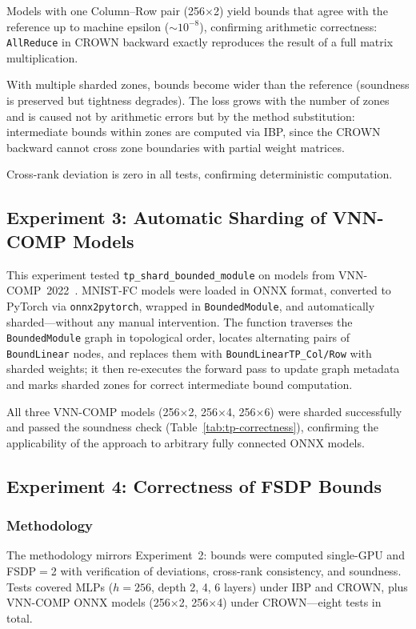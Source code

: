 Models with one Column--Row pair (256$\times$2) yield bounds that agree with
the reference up to machine epsilon ($\sim\!10^{-8}$), confirming arithmetic
correctness: \texttt{AllReduce} in CROWN backward exactly reproduces the result
of a full matrix multiplication.

With multiple sharded zones, bounds become wider than the reference (soundness
is preserved but tightness degrades). The loss grows with the number of zones
and is caused not by arithmetic errors but by the method substitution:
intermediate bounds within zones are computed via IBP, since the CROWN backward
cannot cross zone boundaries with partial weight matrices.

Cross-rank deviation is zero in all tests, confirming deterministic computation.

\subsection{Experiment 3: Automatic Sharding of VNN-COMP Models}

This experiment tested \texttt{tp\_shard\_bounded\_module} on models from
VNN-COMP~2022~\cite{arXiv2212VNNCOMP2022}. MNIST-FC models were loaded in ONNX
format, converted to PyTorch via \texttt{onnx2pytorch}, wrapped in
\texttt{BoundedModule}, and automatically sharded---without any manual
intervention. The function traverses the \texttt{BoundedModule} graph in
topological order, locates alternating pairs of \texttt{BoundLinear} nodes, and
replaces them with \texttt{BoundLinearTP\_Col/Row} with sharded weights; it
then re-executes the forward pass to update graph metadata and marks sharded
zones for correct intermediate bound computation.

All three VNN-COMP models (256$\times$2, 256$\times$4, 256$\times$6) were
sharded successfully and passed the soundness check
(Table~\ref{tab:tp-correctness}), confirming the applicability of the approach
to arbitrary fully connected ONNX models.

\subsection{Experiment 4: Correctness of FSDP Bounds}

\subsubsection{Methodology}

The methodology mirrors Experiment~2: bounds were computed single-GPU and
FSDP$=$2 with verification of deviations, cross-rank consistency, and soundness.
Tests covered MLPs ($h = 256$, depth 2, 4, 6 layers) under IBP and CROWN, plus
VNN-COMP ONNX models (256$\times$2, 256$\times$4) under CROWN---eight tests in total.

